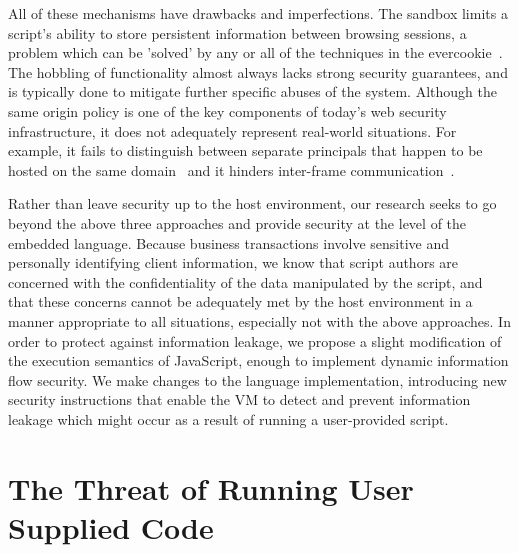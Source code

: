 \documentclass[preprint]{sigplanconf}
\begin{document}
All of these mechanisms have drawbacks and imperfections.
The sandbox limits a script's ability to store persistent information between browsing sessions, a problem which can be 'solved' by any or all of the techniques in the evercookie~\cite{evercookie}.
The hobbling of functionality almost always lacks strong security guarantees, and is typically done to mitigate further specific abuses of the system.
Although the same origin policy is one of the key components of today's web security infrastructure, it does not adequately represent real-world situations.
For example, it fails to distinguish between separate principals that happen to be hosted on the same domain~\cite{draft-abarth-principles-of-origin-00} and it hinders inter-frame communication~\cite{1496713}.

Rather than leave security up to the host environment, our research seeks to go beyond the above three approaches and provide security at the level of the embedded language.
Because business transactions involve sensitive and personally identifying client information, we know that script authors are concerned with the confidentiality of the data manipulated by the script, and that these concerns cannot be adequately met by the host environment in a manner appropriate to all situations, especially not with the above approaches.
In order to protect against information leakage, we propose a slight modification of the execution semantics of JavaScript, enough to implement dynamic information flow security.
We make changes to the language implementation, introducing new security instructions that enable the VM to detect and prevent information leakage which might occur as a result of running a user-provided script.


\section{The Threat of Running User Supplied Code}
\label{sec:threat-model}
\end{document}
